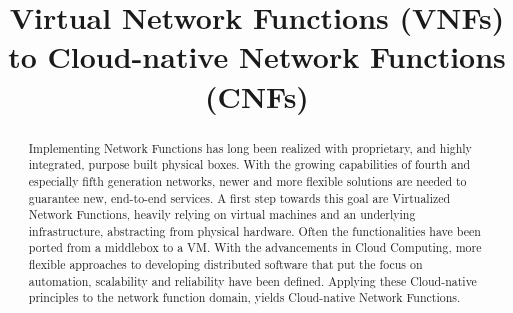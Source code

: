 \documentclass[conference, a4paper]{IEEEtran}
\begin{document}
%
\title{Virtual Network Functions (VNFs) to Cloud-native Network Functions (CNFs)}

\author{
}

\maketitle

\begin{abstract}
Implementing Network Functions has long been realized with proprietary, and highly integrated, purpose built physical boxes. With the growing capabilities of fourth and especially fifth generation networks, newer and more flexible solutions are needed to guarantee new, end-to-end services. A first step towards this goal are Virtualized Network Functions, heavily relying on virtual machines and an underlying infrastructure, abstracting from physical hardware. Often the functionalities have been ported from a middlebox to a VM. With the advancements in Cloud Computing, more flexible approaches to developing distributed software that put the focus on automation, scalability and reliability have been defined. Applying these Cloud-native principles to the network function domain, yields Cloud-native Network Functions.
\end{abstract}

\IEEEpeerreviewmaketitle








\newpage
\tableofcontents

\end{document}
